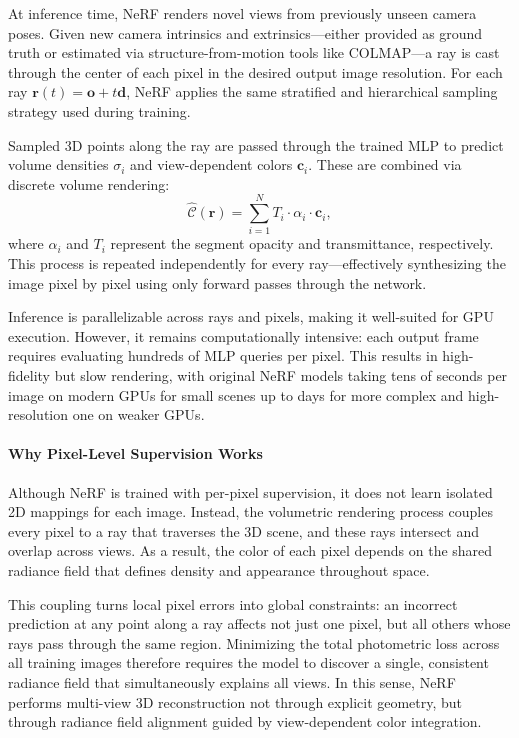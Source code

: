 At inference time, NeRF renders novel views from previously unseen camera poses. Given new camera intrinsics and extrinsics—either provided as ground truth or estimated via structure-from-motion tools like COLMAP—a ray is cast through the center of each pixel in the desired output image resolution. For each ray \( \mathbf{r}(t) = \mathbf{o} + t\mathbf{d} \), NeRF applies the same stratified and hierarchical sampling strategy used during training.

Sampled 3D points along the ray are passed through the trained MLP to predict volume densities \( \sigma_i \) and view-dependent colors \( \mathbf{c}_i \). These are combined via discrete volume rendering:
\[
\hat{\mathcal{C}}(\mathbf{r}) = \sum_{i=1}^{N} T_i \cdot \alpha_i \cdot \mathbf{c}_i,
\]
where \( \alpha_i \) and \( T_i \) represent the segment opacity and transmittance, respectively. This process is repeated independently for every ray—effectively synthesizing the image pixel by pixel using only forward passes through the network.

Inference is parallelizable across rays and pixels, making it well-suited for GPU execution. However, it remains computationally intensive: each output frame requires evaluating hundreds of MLP queries per pixel. This results in high-fidelity but slow rendering, with original NeRF models taking tens of seconds per image on modern GPUs for small scenes up to days for more complex and high-resolution one on weaker GPUs.

\paragraph{Why Pixel-Level Supervision Works}

Although NeRF is trained with per-pixel supervision, it does not learn isolated 2D mappings for each image. Instead, the volumetric rendering process couples every pixel to a ray that traverses the 3D scene, and these rays intersect and overlap across views. As a result, the color of each pixel depends on the shared radiance field that defines density and appearance throughout space.

This coupling turns local pixel errors into global constraints: an incorrect prediction at any point along a ray affects not just one pixel, but all others whose rays pass through the same region. Minimizing the total photometric loss across all training images therefore requires the model to discover a single, consistent radiance field that simultaneously explains all views. In this sense, NeRF performs multi-view 3D reconstruction not through explicit geometry, but through radiance field alignment guided by view-dependent color integration.

